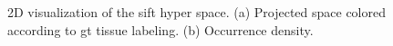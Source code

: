 \documentclass[a4paper, 10pt, conference]{llncs}      %
\begin{document}
\begin{figure}[Htbp]
\centering
\quad
{}

\caption{2D visualization of the \acs{sift} hyper space. (a) Projected space colored according to \acs{gt} tissue labeling. (b) Occurrence density.}
\label{fig:siftMapping}
\end{figure}

\end{document}
